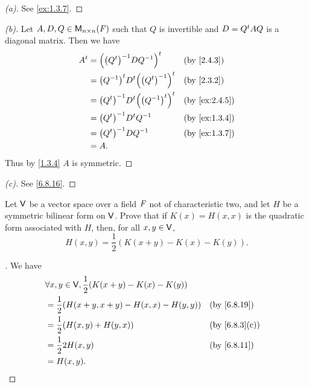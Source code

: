 \begin{proof}[(a)]
  See \cref{ex:1.3.7}.
\end{proof}

\begin{proof}[(b)]
  Let \(A, D, Q \in \ms[n][n][\F]\) such that \(Q\) is invertible and \(D = {Q}^{t} A Q\) is a diagonal matrix.
  Then we have
  \begin{align*}
    \tp{A} & = \tp{\pa{\pa{\tp{Q}}^{-1} D Q^{-1}}}                &  & \by{2.4.3}    \\
           & = \tp{\pa{Q^{-1}}} \tp{D} \tp{\pa{\pa{\tp{Q}}^{-1}}} &  & \by{2.3.2}    \\
           & = \pa{\tp{Q}}^{-1} \tp{D} \tp{\pa{\tp{\pa{Q^{-1}}}}} &  & \by{ex:2.4.5} \\
           & = \pa{\tp{Q}}^{-1} \tp{D} Q^{-1}                     &  & \by{ex:1.3.4} \\
           & = \pa{\tp{Q}}^{-1} D Q^{-1}                          &  & \by{ex:1.3.7} \\
           & = A.
  \end{align*}
  Thus by \cref{1.3.4} \(A\) is symmetric.
\end{proof}

\begin{proof}[(c)]
  See \cref{6.8.16}.
\end{proof}

\begin{ex}\label{ex:6.8.16}
  Let \(\mathsf{V}\) be a vector space over a field \(\mathit{F}\) not of characteristic two, and let \(H\) be a symmetric bilinear form on \(\mathsf{V}\).
  Prove that if \(K(x) = H(x, x)\) is the quadratic form associated with \(H\), then, for all \(x, y \in \mathsf{V}\),
  \[
    H(x, y) = \dfrac{1}{2} (K(x + y) - K(x) - K(y)).
  \]
\end{ex}

\begin{proof}[]
  We have
  \begin{align*}
     & \forall x, y \in \V, \dfrac{1}{2} (K(x + y) - K(x) - K(y))                    \\
     & = \dfrac{1}{2} (H(x + y, x + y) - H(x, x) - H(y, y))       &  & \by{6.8.19}   \\
     & = \dfrac{1}{2} (H(x, y) + H(y, x))                         &  & \by{6.8.3}[c] \\
     & = \dfrac{1}{2} 2 H(x, y)                                   &  & \by{6.8.11}   \\
     & = H(x, y).
  \end{align*}
\end{proof}

